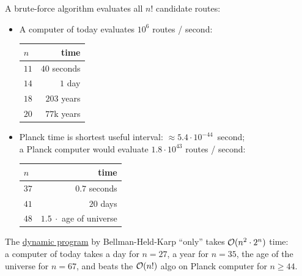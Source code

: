 \documentclass{cons-beamer}
\begin{document}
\begin{frame}
  \begin{example}
    A brute-force algorithm evaluates all $n!$ candidate routes:
    \begin{itemize}
    \item A computer of today evaluates $10^6$ routes / second:
      \begin{center}\footnotesize
        \begin{tabular}{lr}
          $n$ & time \\
          \hline
          $11$  & $40$ seconds \\ 
          $14$  & $1$ day \\ 
          $18$  & $203$ years \\ 
          $20$  & $77$k years
        \end{tabular}
      \end{center}
    \item Planck time is shortest useful interval:
      $\approx 5.4 \cdot 10^{-44}$~second; \\ a Planck computer would
      evaluate $1.8 \cdot 10^{43}$ routes / second: 
      \begin{center}\footnotesize
        \begin{tabular}{lr}
          $n$ & time \\
          \hline
          $37$  & $0.7$ seconds \\ 
          $41$  & $20$ days \\ 
          $48$  & $1.5 ~\cdot$ age of universe
        \end{tabular}
      \end{center}
    \end{itemize}
    The \underline{dynamic program} by Bellman-Held-Karp ``only'' takes
    $\mathcal{O}(n^2 \cdot 2^n)$ time: \\ a computer of today takes a day for
    $n=27$, a year for $n=35$, the age of the universe for $n=67$, and
    beats the $\mathcal{O}(n!)$ algo on
    Planck computer for $n \geq 44$.
  \end{example}
\end{frame}
\end{document}
